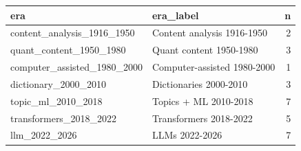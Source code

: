\begin{tabular}{llr}
\toprule
era & era\_label & n \\
\midrule
content\_analysis\_1916\_1950 & Content analysis
1916-1950 & 2 \\
quant\_content\_1950\_1980 & Quant content
1950-1980 & 3 \\
computer\_assisted\_1980\_2000 & Computer-assisted
1980-2000 & 1 \\
dictionary\_2000\_2010 & Dictionaries
2000-2010 & 3 \\
topic\_ml\_2010\_2018 & Topics + ML
2010-2018 & 7 \\
transformers\_2018\_2022 & Transformers
2018-2022 & 5 \\
llm\_2022\_2026 & LLMs
2022-2026 & 7 \\
\bottomrule
\end{tabular}
